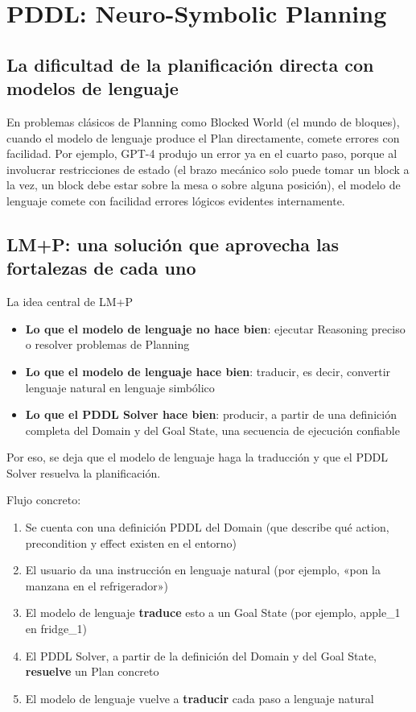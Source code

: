 \section{PDDL: Neuro-Symbolic Planning}

\subsection{La dificultad de la planificación directa con modelos de lenguaje}

En problemas clásicos de Planning como Blocked World (el mundo de bloques), cuando el modelo de lenguaje produce el Plan directamente, comete errores con facilidad. Por ejemplo, GPT-4 produjo un error ya en el cuarto paso, porque al involucrar restricciones de estado (el brazo mecánico solo puede tomar un block a la vez, un block debe estar sobre la mesa o sobre alguna posición), el modelo de lenguaje comete con facilidad errores lógicos evidentes internamente.

\subsection{LM+P: una solución que aprovecha las fortalezas de cada uno}

\begin{importantbox}{La idea central de LM+P}
\begin{itemize}
    \item \textbf{Lo que el modelo de lenguaje no hace bien}: ejecutar Reasoning preciso o resolver problemas de Planning
    \item \textbf{Lo que el modelo de lenguaje hace bien}: traducir, es decir, convertir lenguaje natural en lenguaje simbólico
    \item \textbf{Lo que el PDDL Solver hace bien}: producir, a partir de una definición completa del Domain y del Goal State, una secuencia de ejecución confiable
\end{itemize}
Por eso, se deja que el modelo de lenguaje haga la traducción y que el PDDL Solver resuelva la planificación.
\end{importantbox}

Flujo concreto:
\begin{enumerate}
    \item Se cuenta con una definición PDDL del Domain (que describe qué action, precondition y effect existen en el entorno)
    \item El usuario da una instrucción en lenguaje natural (por ejemplo, «pon la manzana en el refrigerador»)
    \item El modelo de lenguaje \textbf{traduce} esto a un Goal State (por ejemplo, apple\_1 en fridge\_1)
    \item El PDDL Solver, a partir de la definición del Domain y del Goal State, \textbf{resuelve} un Plan concreto
    \item El modelo de lenguaje vuelve a \textbf{traducir} cada paso a lenguaje natural
\end{enumerate}

